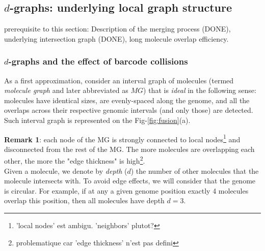 \subsection{$d$-graphs: underlying local graph structure}
prerequisite to this section: Description of the merging process (DONE), underlying intersection graph (DONE), long molecule overlap efficiency. 



\subsubsection*{$d$-graphs and the effect of barcode collisions}

As a first approximation, consider an interval graph of molecules (termed \emph{molecule graph} and later abbreviated as $MG$) that is \emph{ideal} in the following sense: molecules have identical sizes, are evenly-spaced along the genome, and all the overlaps across their respective genomic intervals (and only those) are detected.
Such interval graph is represented on the Fig-\ref{fig:fusion}(a). 

\textbf{Remark 1}: %
each node of the MG is strongly connected to local nodes\footnote{ 'local nodes' est ambigu. 'neighbors' plutot?} and disconnected from the rest of the MG. The more molecules are overlapping each other,  the more the "edge thickness" is high\footnote{problematique car 'edge thickness' n'est pas defini}.\\

Given a molecule, we denote by \textit{depth} ($d$) the number of other molecules that the molecule intersects with. To avoid edge effects, we will consider that the genome is circular. For example, if at any a given genome position exactly 4 molecules overlap this position, then all molecules have depth $d=3$.

